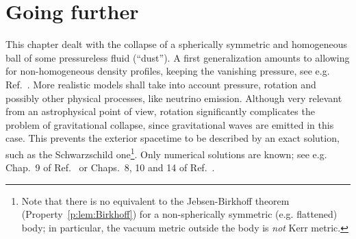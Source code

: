 \section{Going further}

This chapter dealt with the collapse of a spherically symmetric and homogeneous ball of some
pressureless fluid (``dust'').
A first generalization amounts to allowing for non-homogeneous density profiles,
keeping the vanishing pressure, see e.g. Ref.~\cite{PlebaK06}.
More realistic models shall take into account pressure, rotation and possibly
other physical processes, like neutrino emission.
Although very relevant from an astrophysical point of view, rotation
significantly complicates the problem of gravitational collapse,
since gravitational waves are emitted in this case.
This prevents the exterior spacetime to be described by an exact solution,
such as the Schwarzschild one\footnote{Note that there is no equivalent to the
Jebsen-Birkhoff theorem
(Property~\ref{p:lem:Birkhoff}) for a non-spherically symmetric (e.g. flattened) body;
in particular, the vacuum metric
outside the body is \emph{not} Kerr metric.}. Only numerical solutions are known;
see e.g. Chap.~9 of Ref.~\cite{Shiba16} or Chaps.~8, 10 and 14 of Ref.~\cite{BaumgS10}.




